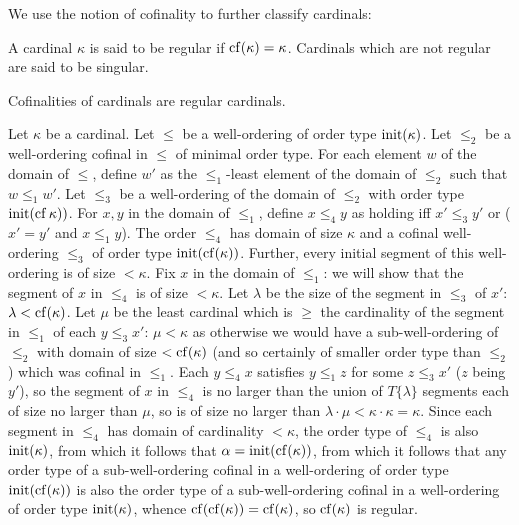We use the notion of cofinality to further classify cardinals:

\begin{definition}
 A cardinal $\kappa$ is said to be {\upshape
 regular} 
 if $\mathop{\mathrm{cf}}(\kappa) = \kappa$.  Cardinals which are not regular are said
 to be {\upshape singular}.
\end{definition}


\begin{thm}
 Cofinalities of cardinals are regular cardinals.
\end{thm}

\preuve  Let $\kappa$ be a cardinal.  Let $\leq$ be a well-ordering of order type $\mathop{\mathrm{init}}(\kappa)$.  Let $\leq_2$ be a well-ordering cofinal
in $\leq$ of minimal order type.   For each element $w$ of the domain of $\leq$, define $w'$ as the $\leq_1$-least element of the domain
of $\leq_2$ such that $w \leq_1 w'$.   Let $\leq_3$ be a well-ordering of the domain of $\leq_2$ with order type $\mathop{\mathrm{init}}(\mathop{\mathrm{cf}}\kappa))$.
For $x,y$ in the domain of $\leq_1$, define $x \leq_4 y$ as holding iff $x' \leq_3 y'$ or ($x'=y'$ and $x\leq_1 y$).   The order $\leq_4$ has domain of size $\kappa$ and a cofinal well-ordering $\leq_3$ of order type $\mathop{\mathrm{init}}(\mathop{\mathrm{cf}}(\kappa))$.  Further, every initial segment of this well-ordering is of size
$<\kappa$.   Fix $x$ in the domain of $\leq_1$:  we will show that the segment of $x$ in $\leq_4$ is of size $<\kappa$.  Let $\lambda$ be the size of the segment in $\leq_3$ of $x'$:  $\lambda<\mathop{\mathrm{cf}}(\kappa)$.   Let $\mu$ be the least cardinal which is $\geq$ the cardinality of the segment in $\leq_1$ of each $y \leq_3 x'$:  $\mu <\kappa$ as otherwise we would have a sub-well-ordering of $\leq_2$ with domain of size $<\mathop{\mathrm{cf}}(\kappa)$ (and so certainly of smaller order type than $\leq_2$) which was cofinal in $\leq_1$.  Each $y \leq_4 x$
satisfies $y \leq_1 z$ for some $z \leq_3 x'$ ($z$ being $y'$), so the segment of $x$ in $\leq_4$ is no larger than the union of $T\{\lambda\}$ segments
each of size no larger than $\mu$, so is of size no larger than $\lambda\cdot\mu <\kappa\cdot\kappa=\kappa$.  Since each segment in $\leq_4$
has domain of cardinality $<\kappa$, the order type of $\leq_4$ is also $\mathop{\mathrm{init}}(\kappa)$, from which it follows that $\alpha=\mathop{\mathrm{init}}(\mathop{\mathrm{cf}}(\kappa))$,
from which it follows that any order type of a sub-well-ordering cofinal in a well-ordering of order type $\mathop{\mathrm{init}}(\mathop{\mathrm{cf}}(\kappa))$ is also the order type of a sub-well-ordering cofinal in a well-ordering of order type $\mathop{\mathrm{init}}(\kappa)$, whence $\mathop{\mathrm{cf}}(\mathop{\mathrm{cf}}(\kappa))=\mathop{\mathrm{cf}}(\kappa)$, so $\mathop{\mathrm{cf}}(\kappa)$ is regular.

